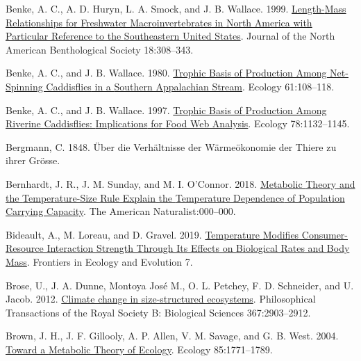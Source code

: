 \documentclass[
]{article}
\newlength{\cslhangindent}
\newlength{\cslentryspacingunit} %
\newenvironment{CSLReferences}[2] %
 {%
  \setlength{\parindent}{0pt}
  \ifodd #1
  \let\oldpar\par
  \def\par{\hangindent=\cslhangindent\oldpar}
  \fi
  \setlength{\parskip}{#2\cslentryspacingunit}
 }%
 {}
\begin{document}
\begin{CSLReferences}{1}{0}
\leavevmode{}%
Benke, A. C., A. D. Huryn, L. A. Smock, and J. B. Wallace. 1999.
\href{https://doi.org/10.2307/1468447}{Length-{Mass Relationships} for
{Freshwater Macroinvertebrates} in {North America} with {Particular
Reference} to the {Southeastern United States}}. Journal of the North
American Benthological Society 18:308--343.

\leavevmode{}%
Benke, A. C., and J. B. Wallace. 1980.
\href{https://doi.org/10.2307/1937161}{Trophic {Basis} of {Production
Among Net-Spinning Caddisflies} in a {Southern Appalachian Stream}}.
Ecology 61:108--118.

\leavevmode{}%
Benke, A. C., and J. B. Wallace. 1997.
\href{https://doi.org/10.1890/0012-9658(1997)078\%5B1132:TBOPAR\%5D2.0.CO;2}{Trophic
{Basis} of {Production Among Riverine Caddisflies}: {Implications} for
{Food Web Analysis}}. Ecology 78:1132--1145.

\leavevmode{}%
Bergmann, C. 1848. Über die {Verhältnisse} der {Wärmeökonomie} der
{Thiere} zu ihrer {Grösse}.

\leavevmode{}%
Bernhardt, J. R., J. M. Sunday, and M. I. O'Connor. 2018.
\href{https://doi.org/10.1086/700114}{Metabolic {Theory} and the
{Temperature-Size Rule Explain} the {Temperature Dependence} of
{Population Carrying Capacity}}. The American Naturalist:000--000.

\leavevmode{}%
Bideault, A., M. Loreau, and D. Gravel. 2019.
\href{https://doi.org/10.3389/fevo.2019.00045}{Temperature {Modifies
Consumer-Resource Interaction Strength Through Its Effects} on
{Biological Rates} and {Body Mass}}. Frontiers in Ecology and Evolution
7.

\leavevmode{}%
Brose, U., J. A. Dunne, Montoya José M., O. L. Petchey, F. D. Schneider,
and U. Jacob. 2012.
\href{https://doi.org/10.1098/rstb.2012.0232}{Climate change in
size-structured ecosystems}. Philosophical Transactions of the Royal
Society B: Biological Sciences 367:2903--2912.

\leavevmode{}%
Brown, J. H., J. F. Gillooly, A. P. Allen, V. M. Savage, and G. B. West.
2004. \href{https://doi.org/10.1890/03-9000}{Toward a {Metabolic Theory}
of {Ecology}}. Ecology 85:1771--1789.


\end{CSLReferences}
\end{document}
